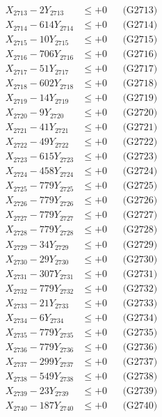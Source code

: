\documentclass[a4paper,10pt]{article}
\begin{document}
{\begin{align}
X_{2713} - 2Y_{2713} &\leq +0 && \text{(G2713)} \\
X_{2714} - 614Y_{2714} &\leq +0 && \text{(G2714)} \\
X_{2715} - 10Y_{2715} &\leq +0 && \text{(G2715)} \\
X_{2716} - 706Y_{2716} &\leq +0 && \text{(G2716)} \\
X_{2717} - 51Y_{2717} &\leq +0 && \text{(G2717)} \\
X_{2718} - 602Y_{2718} &\leq +0 && \text{(G2718)} \\
X_{2719} - 14Y_{2719} &\leq +0 && \text{(G2719)} \\
X_{2720} - 9Y_{2720} &\leq +0 && \text{(G2720)} \\
\allowbreak
X_{2721} - 41Y_{2721} &\leq +0 && \text{(G2721)} \\
X_{2722} - 49Y_{2722} &\leq +0 && \text{(G2722)} \\
X_{2723} - 615Y_{2723} &\leq +0 && \text{(G2723)} \\
X_{2724} - 458Y_{2724} &\leq +0 && \text{(G2724)} \\
X_{2725} - 779Y_{2725} &\leq +0 && \text{(G2725)} \\
X_{2726} - 779Y_{2726} &\leq +0 && \text{(G2726)} \\
X_{2727} - 779Y_{2727} &\leq +0 && \text{(G2727)} \\
X_{2728} - 779Y_{2728} &\leq +0 && \text{(G2728)} \\
X_{2729} - 34Y_{2729} &\leq +0 && \text{(G2729)} \\
X_{2730} - 29Y_{2730} &\leq +0 && \text{(G2730)} \\
\allowbreak
X_{2731} - 307Y_{2731} &\leq +0 && \text{(G2731)} \\
X_{2732} - 779Y_{2732} &\leq +0 && \text{(G2732)} \\
X_{2733} - 21Y_{2733} &\leq +0 && \text{(G2733)} \\
X_{2734} - 6Y_{2734} &\leq +0 && \text{(G2734)} \\
X_{2735} - 779Y_{2735} &\leq +0 && \text{(G2735)} \\
X_{2736} - 779Y_{2736} &\leq +0 && \text{(G2736)} \\
X_{2737} - 299Y_{2737} &\leq +0 && \text{(G2737)} \\
X_{2738} - 549Y_{2738} &\leq +0 && \text{(G2738)} \\
X_{2739} - 23Y_{2739} &\leq +0 && \text{(G2739)} \\
X_{2740} - 187Y_{2740} &\leq +0 && \text{(G2740)} \\

\end{align}}
\end{document}

